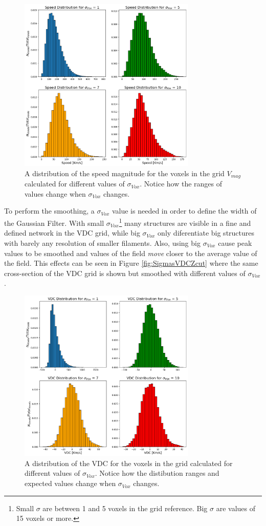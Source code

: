\documentclass[a4paper,fleqn,usenatbib]{mnras}
\begin{document}
\begin{figure}
    \centering
    \includegraphics[width=240pt]{VMD_varios.png}
    \caption{A distribution of the speed magnitude for the voxels in the grid $V_{mag}$ calculated for different values of $\sigma_{Vox}$. Notice how the ranges of values change when $\sigma_{Vox}$ changes.}
    \label{fig:MD_Varios}
\end{figure}

To perform the smoothing, a $\sigma_{Vox}$ value is needed in order to define the width of the Gaussian Filter. With small $\sigma_{Vox}$\footnote{Small $\sigma$ are between 1 and 5 voxels in the grid reference. Big $\sigma$ are values of 15 voxels or more.} many structures are visible in a fine and defined network in the VDC grid, while big $\sigma_{Vox}$ only diferentiate big structures with barely any resolution of smaller filaments. Also, using big $\sigma_{Vox}$ cause peak values to be smoothed and values of the field \textit{move }closer to  the average value of the field. This effects can be seen in Figure \ref{fig:SigmasVDCZcut} where the same cross-section of the VDC grid is shown but smoothed with different values of $\sigma_{Vox}$.


\begin{figure}
    \centering
    \includegraphics[width=240pt]{VCD_varios.png}
    \caption{A distribution of the VDC for the voxels in the grid calculated for different values of $\sigma_{Vox}$. Notice how the distibution ranges and expected values change when $\sigma_{Vox}$ changes.}
    \label{fig:VCD_Varios}
\end{figure}
\end{document}
